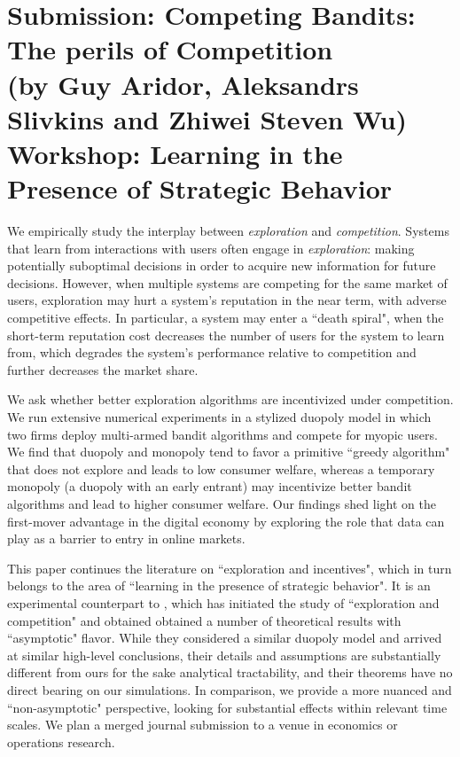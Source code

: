 \documentclass[11pt,letterpaper]{article}
\begin{document}

\section*{Submission: Competing Bandits: The perils of Competition\\
{\large (by Guy Aridor, Aleksandrs Slivkins and Zhiwei Steven Wu)}\\
{\large Workshop: Learning in the Presence of Strategic Behavior}
}

We empirically study the interplay between \textit{exploration} and
  \textit{competition}. Systems that learn from interactions with
  users often engage in \emph{exploration}: making potentially
  suboptimal decisions in order to acquire new information for future
  decisions. However, when multiple systems are competing for
    the same market of users, exploration may hurt a system's
    reputation in the near term, with adverse competitive effects. In particular, a system may enter a ``death spiral", when the short-term reputation cost decreases
    the number of users for the system to learn from, which degrades the
    system's performance relative to competition and further decreases
    the market share.

We ask whether better exploration algorithms are incentivized under competition. We run extensive numerical experiments in a stylized duopoly model in which two firms deploy multi-armed bandit algorithms and compete for myopic users.  We find that duopoly and monopoly tend to favor a primitive ``greedy algorithm" that does not explore and leads to low consumer welfare, whereas a temporary monopoly (a duopoly with an early entrant) may incentivize better bandit algorithms and lead to higher consumer welfare. Our findings shed light on the first-mover advantage in the digital economy by exploring the role that data can play as a barrier to entry in online markets.

\vspace{2mm}

This paper continues the literature on ``exploration and incentives", which in turn belongs to the area of ``learning in the presence of strategic behavior". It is an experimental counterpart to \citet{CompetingBandits-itcs18}, which has initiated the study of ``exploration and competition" and obtained obtained a number of theoretical results with ``asymptotic" flavor. While they considered a similar duopoly model and arrived at similar high-level conclusions, their details and assumptions are substantially different from ours for the sake analytical tractability, and their theorems have no direct bearing on our simulations. In comparison, we provide a more nuanced and ``non-asymptotic" perspective, looking for substantial effects within relevant time scales. We plan a merged journal submission to a venue in economics or operations research.

\begin{small}


\end{small}
\end{document}
